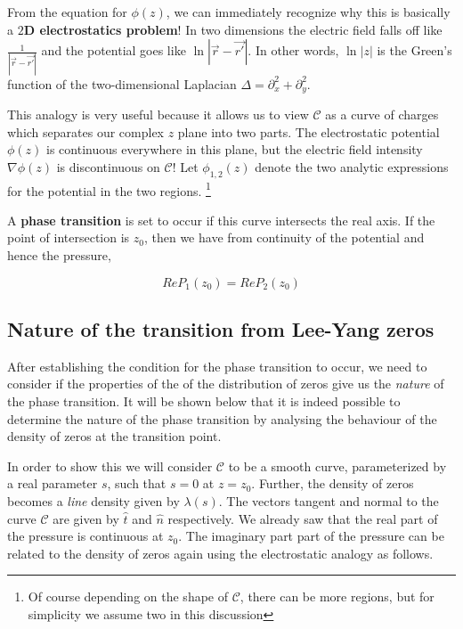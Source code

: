 \documentclass[11pt,a4paper]{article}
\begin{document}
\noindent From the equation for $\phi(z)$, we can immediately recognize why this is basically a \textbf{$2$D electrostatics problem}! In two dimensions the electric field falls off like $\frac{1}{|\Vec{r} - \Vec{r'}|}$ and the potential goes like $\ln | \Vec{r} - \Vec{r'} |$. In other words, $\ln |z|$ is the Green's function of the two-dimensional Laplacian $\Delta = \partial^2_x + \partial^2_y$.

\noindent This analogy is very useful because it allows us to view $\mathcal{C}$ as a curve of charges which separates our complex $z$ plane into two parts. The electrostatic potential $\phi(z)$ is continuous everywhere in this plane, but the electric field intensity $\nabla \phi(z)$ is discontinuous on $\mathcal{C}$! Let $\phi_{1,2} (z)$ denote the two analytic expressions for the potential in the two regions. \footnote{Of course depending on the shape of $\mathcal{C}$, there can be more regions, but for simplicity we assume two in this discussion}  

A \textbf{phase transition} is set to occur if this curve intersects the real axis. If the point of intersection is $z_0$, then we have from continuity of the potential and hence the pressure,

\begin{equation*}
    Re P_1(z_0) = Re P_2(z_0)
\end{equation*}

\subsection{Nature of the transition from Lee-Yang zeros}
After establishing the condition for the phase transition to occur, we need to consider if the properties of the of the distribution of zeros give us the \emph{nature} of the phase transition. It will be shown below that it is indeed possible to determine the nature of the phase transition by analysing the behaviour of the density of zeros at the transition point. 

In order to show this we will consider $\mathcal{C}$ to be a smooth curve, parameterized by a real parameter $s$, such that $s=0$ at $z=z_0$. Further, the density of zeros becomes a \emph{line} density given by $\lambda(s)$. The vectors tangent and normal to the curve $\mathcal{C}$ are given by $\hat{t}$ and $\hat{n}$ respectively. We already saw that the real part of the pressure is continuous at $z_0$. The imaginary part part of the pressure can be related to the density of zeros again using the electrostatic analogy as follows.
\end{document}
